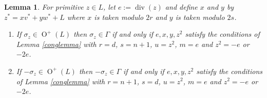 \documentclass[12pt, a4paper]{article}
\newtheorem{lemma}[thm]{Lemma}
\newcommand{\opn}{\operatorname}
\begin{document}
\begin{lemma}\label{qrinvs}
  For primitive $z \in L$, let $e:=\opn{div}(z)$ and define $x$ and $y$ by $z^* = xv^* + yw^* + L$ where $x$ is taken modulo $2r$ and $y$ is taken modulo $2s$.
  \begin{enumerate}
  \item  If $\sigma_z \in \opn{O}^+(L)$ then $\sigma_z \in \Gamma$ if and only if $e,x,y,z^2$ satisfy the conditions of Lemma \ref{conglemma} with $r=d$, $s=n+1$, $u=z^2$, $m=e$ and  $z^2=-e$ or $-2e$.
  \item If $-\sigma_z \in \opn{O}^+(L)$ then $-\sigma_z \in \Gamma$ if and only if $e,x,y,z^2$ satisfy the conditions of Lemma \ref{conglemma} with $r=n+1$, $s=d$, $u=z^2$, $m=e$ and  $z^2 = -e$ or $-2e$.
  \end{enumerate}
\end{lemma}
\end{document}
